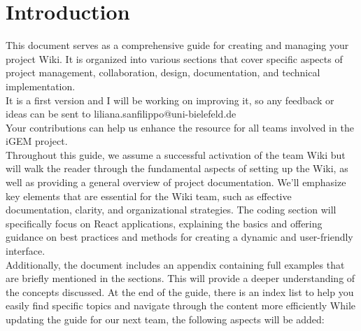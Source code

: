 \documentclass[a4paper, 11pt, twoside]{book}
\begin{document}
\pagecolor{pagecolor}
\frontmatter

\tableofcontents
\newpage


\pagecolor{pagecolor}


\section{Introduction}
This document serves as a comprehensive guide for creating and managing your project Wiki. It is organized into various sections that cover specific aspects of project management, collaboration, design, documentation, and technical implementation. \\
It is a first version and I will be working on improving it, so any feedback or ideas can be sent to liliana.sanfilippo@uni-bielefeld.de \\
Your contributions can help us enhance the resource for all teams involved in the iGEM project. \\ \newline
Throughout this guide, we assume a successful activation of the team Wiki but will walk the reader through the fundamental aspects of setting up the Wiki, as well as providing a general overview of project documentation. We'll emphasize key elements that are essential for the Wiki team, such as effective documentation, clarity, and organizational strategies. The coding section will specifically focus on React applications, explaining the basics and offering guidance on best practices and methods for creating a dynamic and user-friendly interface. \\ \newline
Additionally, the document includes an appendix containing full examples that are briefly mentioned in the sections. This will provide a deeper understanding of the concepts discussed. At the end of the guide, there is an index list to help you easily find specific topics and navigate through the content more efficiently
While updating the guide for our next team, the following aspects will be added:
\end{document}
